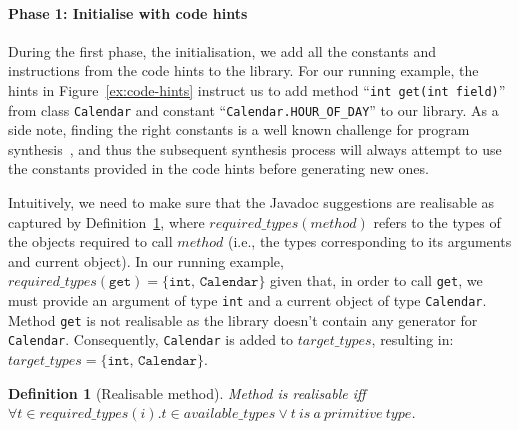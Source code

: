 \documentclass[sigconf]{acmart}
\newtheorem{definition}{Definition}
\newcommand{\availabletypes}{\mbox{$\mathit{available\_types}$}\xspace}
\newcommand{\targettypes}{\mbox{$\mathit{target\_types}$}\xspace}
\newcommand{\requiredtypes}{\mbox{$\mathit{required\_types}$}\xspace}
\begin{document}
\paragraph{{\bf Phase 1: Initialise with code hints}}
During the first phase, the initialisation, we add all the constants and instructions from the code hints to the library.
%
For our running example, the hints in Figure~\ref{ex:code-hints} %
instruct us to add method ``\lstinline[breaklines=true]{int get(int field)}'' from class
\lstinline[breaklines=true]{Calendar} and constant ``\lstinline[breaklines=true]{Calendar.HOUR_OF_DAY}'' to our library.
As a side note, finding the right constants is a well known
challenge for program synthesis~\cite{DBLP:conf/cav/AbateDKKP18}, and thus the subsequent
synthesis process will always attempt to use the constants provided in the code hints before generating new ones.

Intuitively, we need to make sure that the Javadoc suggestions
are realisable as captured by Definition~\ref{def:realizable}, where
$\requiredtypes(\allowbreak method)$ refers to the types of the objects required to call $method$ (i.e., the types corresponding to its arguments and current object).
%
In our running example, $\requiredtypes(\texttt{get}) = \{\texttt{int, Calendar}\}$
given that, in order to call \lstinline[breaklines=true]{get}, we must
provide an argument of type \lstinline[breaklines=true]{int} and a current
object of type \lstinline[breaklines=true]{Calendar}.
Method \lstinline[breaklines=true]{get} is not realisable as the library
doesn't contain any generator for \lstinline[breaklines=true]{Calendar}.
Consequently, \lstinline[breaklines=true]{Calendar} is added to
\targettypes, resulting in:
%
$\targettypes = \{\texttt{int, Calendar}\}$.

\begin{definition}[Realisable method]\label{def:realizable}
%
Method  is {\em realisable} iff $\forall t \in
\requiredtypes(i). t \in \availabletypes \vee t~is~a~\mathit{primitive}~\mathit{type}$.
%
\end{definition}
\end{document}
